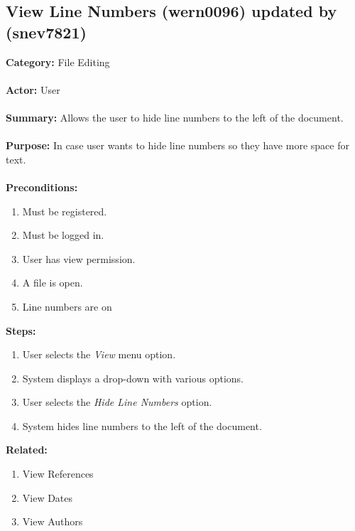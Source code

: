 \documentclass[11pt]{report}
\begin{document}
\subsection{View Line Numbers (wern0096) updated by (snev7821)}
\begin{framed}

	\textbf{Category:} File Editing \\ \\
	\textbf{Actor:} User \\ \\
	\textbf{Summary:} Allows the user to hide line numbers to the left of the document. \\ \\
	\textbf{Purpose:} In case user wants to hide line numbers so they have more space for text.\\ \\
	\textbf{Preconditions:} 
	\begin{enumerate}
		\item Must be registered.
		\item Must be logged in.
		\item User has view permission.
		\item A file is open.
		\item Line numbers are on
	\end{enumerate}
	\textbf{Steps:}
	\begin{enumerate}
		\item User selects the \textit{View} menu option.
		\item System displays a drop-down with various options.
		\item User selects the \textit{Hide Line Numbers} option.
		\item System hides line numbers to the left of the document.
	\end{enumerate}
	\textbf{Related:}
	\begin{enumerate}
		\item View References
		\item View Dates
		\item View Authors
	\end{enumerate}
\end{framed}

\newpage
\end{document}
